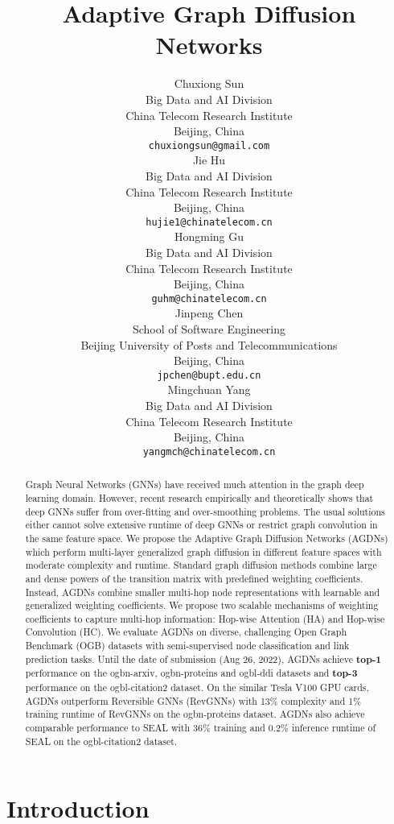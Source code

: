\documentclass{article}
\title{Adaptive Graph Diffusion Networks}
\author{
 Chuxiong Sun \\
  Big Data and AI Division\\
  China Telecom Research Institute \\
  Beijing, China \\
  \texttt{chuxiongsun@gmail.com} \\
 \And
 Jie Hu \\
  Big Data and AI Division\\
  China Telecom Research Institute \\
  Beijing, China \\
  \texttt{hujie1@chinatelecom.cn} \\
 \And
 Hongming Gu \\
  Big Data and AI Division\\
  China Telecom Research Institute \\
  Beijing, China \\
  \texttt{guhm@chinatelecom.cn} \\
 \And
 Jinpeng Chen \\
  School of Software Engineering\\
  Beijing University of Posts and Telecommunications\\
  Beijing, China \\
  \texttt{jpchen@bupt.edu.cn} \\
 \And
 Mingchuan Yang \\
  Big Data and AI Division\\
  China Telecom Research Institute \\
  Beijing, China \\
  \texttt{yangmch@chinatelecom.cn} \\

}
\begin{document}
\maketitle
\begin{abstract}
Graph Neural Networks (GNNs) have received much attention in the graph deep learning domain. However, recent research empirically and theoretically shows that deep GNNs suffer from over-fitting and over-smoothing problems. The usual solutions either cannot solve extensive runtime of deep GNNs or restrict graph convolution in the same feature space. We propose the Adaptive Graph Diffusion Networks (AGDNs) which perform multi-layer generalized graph diffusion in different feature spaces with moderate complexity and runtime. Standard graph diffusion methods combine large and dense powers of the transition matrix with predefined weighting coefficients. Instead, AGDNs combine smaller multi-hop node representations with learnable and generalized weighting coefficients. We propose two scalable mechanisms of weighting coefficients to capture multi-hop information: Hop-wise Attention (HA) and Hop-wise Convolution (HC). We evaluate AGDNs on diverse, challenging Open Graph Benchmark (OGB) datasets with semi-supervised node classification and link prediction tasks. Until the date of submission (Aug 26, 2022), AGDNs achieve \textbf{top-1} performance on the ogbn-arxiv, ogbn-proteins and ogbl-ddi datasets and \textbf{top-3} performance on the ogbl-citation2 dataset. On the similar Tesla V100 GPU cards, AGDNs outperform Reversible GNNs (RevGNNs) with 13\% complexity and 1\% training runtime of RevGNNs on the ogbn-proteins dataset. AGDNs also achieve comparable performance to SEAL with 36\% training and 0.2\% inference runtime of SEAL on the ogbl-citation2 dataset.
\end{abstract}





\section{Introduction}
\end{document}
